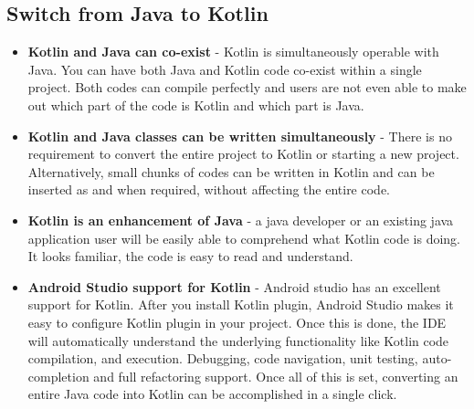 \subsection{Switch from Java to Kotlin}
\begin{itemize}
    \item \textbf{Kotlin and Java can co-exist} - Kotlin is simultaneously operable with Java. You can have both Java and Kotlin code co-exist within a single project. Both codes can compile perfectly and users are not even able to make out which part of the code is Kotlin and which part is Java.
    \item \textbf{Kotlin and Java classes can be written simultaneously} - There is no requirement to convert the entire project to Kotlin or starting a new project. Alternatively, small chunks of codes can be written in Kotlin and can be inserted as and when required, without affecting the entire code.
    \item \textbf{Kotlin is an enhancement of Java} - a java developer or an existing java application user will be easily able to comprehend what Kotlin code is doing. It looks familiar, the code is easy to read and understand.
   \item \textbf{Android Studio support for Kotlin} - Android studio has an excellent support for Kotlin. After you install Kotlin plugin, Android Studio makes it easy to configure Kotlin plugin in your project. Once this is done, the IDE will automatically understand the underlying functionality like Kotlin code compilation, and execution. Debugging, code navigation, unit testing, auto-completion and full refactoring support. Once all of this is set, converting an entire Java code into Kotlin can be accomplished in a single click.
\end{itemize}
\newpage

